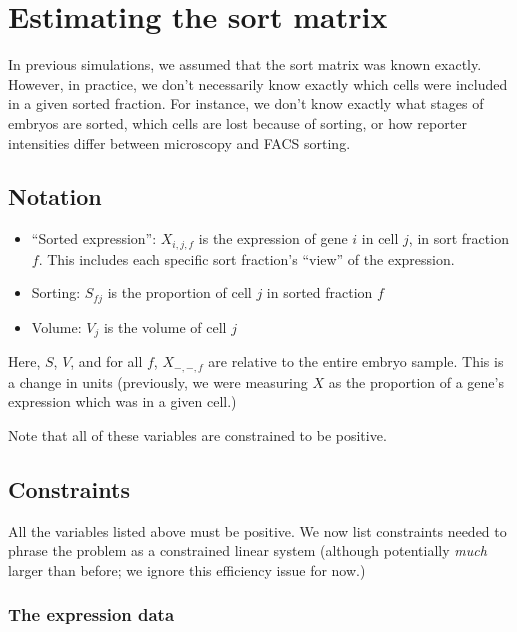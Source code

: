 \documentclass{article}
\begin{document}
\section{Estimating the sort matrix}

In previous simulations, we assumed that the sort matrix was
known exactly. However, in practice, we don't necessarily know
exactly which cells were included in a given sorted fraction.
For instance, we don't know exactly what stages of embryos are
sorted, which cells are lost because of sorting, or how reporter
intensities differ between microscopy and FACS sorting.


\subsection{Notation}



\begin{itemize}

\item ``Sorted expression'': $X_{i,j,f}$ is the expression of gene $i$ in cell $j$, in sort
fraction $f$. This includes each specific sort fraction's
``view'' of the expression.

\item Sorting: $S_{fj}$ is the proportion of cell $j$ in sorted fraction $f$

\item Volume: $V_j$ is the volume of cell $j$

\end{itemize}

Here, $S$, $V$, and for all $f$, $X_{-,-,f}$ are 
relative to the entire embryo sample.
This is a change in units (previously, we were measuring $X$ as
the proportion of a gene's expression which was in a given cell.)

Note that all of these variables are constrained to be positive.

\subsection{Constraints}

All the variables listed above must be positive.
We now list constraints needed to phrase the problem as a
constrained linear system (although potentially {\em much} larger than
before; we ignore this efficiency issue for now.)

\subsubsection{The expression data}
\end{document}
